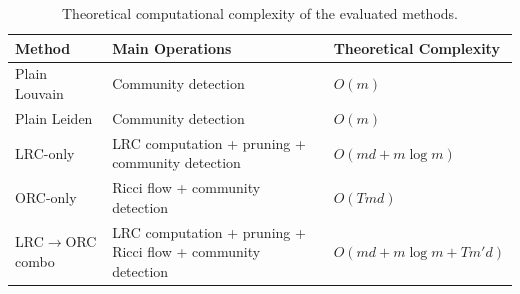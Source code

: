 \begin{table}
\caption{Theoretical computational complexity of the evaluated methods.}
\label{tab:youtube_theoretical_complexity}
\begin{tabular}{lll}
\toprule
Method & Main Operations & Theoretical Complexity \\
\midrule
Plain Louvain & Community detection & $O(m)$ \\
Plain Leiden & Community detection & $O(m)$ \\
LRC-only & LRC computation + pruning + community detection & $O(md + m\log m)$ \\
ORC-only & Ricci flow + community detection & $O(Tmd)$ \\
LRC$\rightarrow$ORC combo & LRC computation + pruning + Ricci flow + community detection & $O(md + m\log m + Tm'd)$ \\
\bottomrule
\end{tabular}
\end{table}
